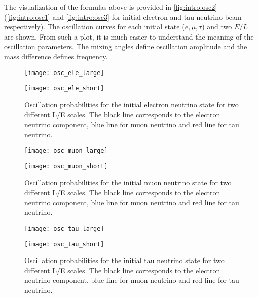 \documentclass[../main.tex]{subfiles}
\begin{document}
The visualization of the formulas above is provided in \autoref{fig:intro:osc2} (\autoref{fig:intro:osc1} and \autoref{fig:intro:osc3} for initial electron and tau neutrino beam respectively). The oscillation curves for each initial state ($e, \mu, \tau$) and two $E/L$ are shown. From such a plot, it is much easier to understand the meaning of the oscillation parameters. The mixing angles define oscillation amplitude and the mass difference defines frequency.

\begin{figure}[!ht]
\centering
\begin{minipage}{0.4\linewidth}
  \centering
  \texttt{[image: osc\_ele\_large]}
\end{minipage}
\hfill
\begin{minipage}{0.4\linewidth}
  \centering
  \texttt{[image: osc\_ele\_short]}
\end{minipage}
\caption{Oscillation probabilities for the initial electron neutrino state for two different L/E scales. The black line corresponds to the electron neutrino component, blue line for muon neutrino and red line for tau neutrino.}
\label{fig:intro:osc1}
\end{figure}

\begin{figure}
\centering
\begin{minipage}{0.4\linewidth}
  \texttt{[image: osc\_muon\_large]}
\end{minipage}
\hfill
\begin{minipage}{0.4\linewidth}
  \texttt{[image: osc\_muon\_short]}
\end{minipage}
\caption{Oscillation probabilities for the initial muon neutrino state for two different L/E scales. The black line corresponds to the electron neutrino component, blue line for muon neutrino and red line for tau neutrino.}
\label{fig:intro:osc2}
\end{figure}

\begin{figure}
\centering
\begin{minipage}{0.4\linewidth}
  \texttt{[image: osc\_tau\_large]}
\end{minipage}
\hfill
\begin{minipage}{0.4\linewidth}
  \texttt{[image: osc\_tau\_short]}
\end{minipage}
\caption{Oscillation probabilities for the initial tau neutrino state for two different L/E scales. The black line corresponds to the electron neutrino component, blue line for muon neutrino and red line for tau neutrino.}
\label{fig:intro:osc3}
\end{figure}
\end{document}
